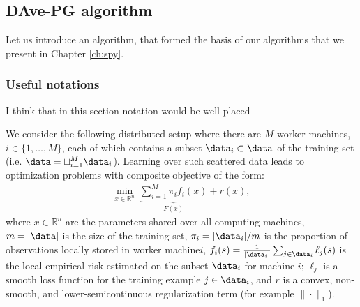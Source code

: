\subsection{DAve-PG algorithm}
Let us introduce an algorithm, that formed the basis of our algorithms that we present in Chapter \ref{ch:spy}. 

\subsubsection{Useful notations}
{\color{yellow}I think that in this section notation would be well-placed}

We consider the following distributed setup where there are $M$ worker machines, $i\in\{1,\ldots,M\}$, each of which contains a subset $\data_i\subset \data$ of the training set (i.e. $\data=\sqcup_{i=1}^M \data_i$). Learning over such scattered data leads to optimization problems with composite objective of the form:
\begin{align}\label{eq:pb}
\min_{x\in\mathbb{R}^n}  ~\underbrace{\sum_{i=1}^M  \pi_i  f_i(x)}_{ F(x)}  +  r(x),
\end{align}
where $x\in\mathbb{R}^n$ are the parameters shared over all computing machines, $m=|\data|$ is the size of the training set, $\pi_i= |\data_i|/m$ is the proportion of observations locally stored in worker machine\;$i$, $f_i(s) = \frac{1}{|\data_i|}  \sum_{j\in\data_i}\ell_j(s) $ is the local empirical risk estimated on the subset $\data_i$ for machine $i$; $\ell_j$ is a smooth loss function for the training example $j\in\data_i$, and $r$ is a convex, non-smooth, and lower-semicontinuous regularization term (for example $\|\cdot\|_1$).


